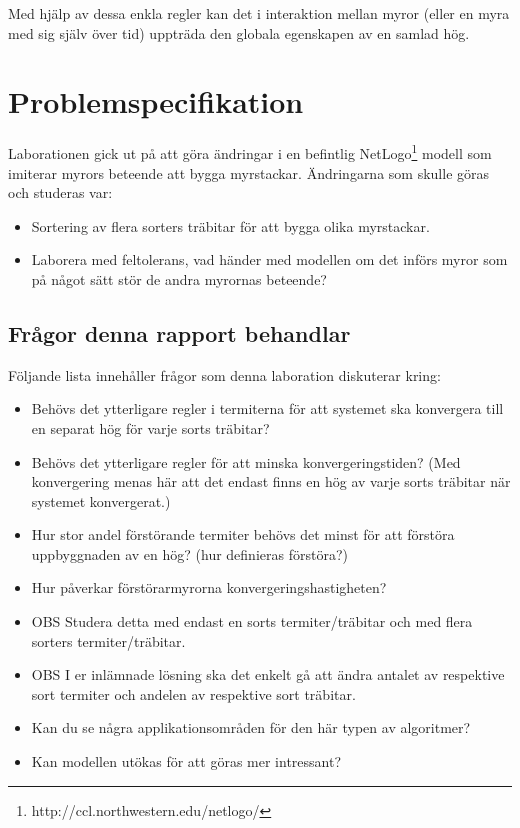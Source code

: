 \documentclass[titlepage, a4paper, 12pt]{article}
\begin{document}
Med hjälp av dessa enkla regler kan det i interaktion mellan myror
(eller en myra med sig själv över tid) uppträda den globala egenskapen
av en samlad hög.

\section{Problemspecifikation}\label{sec:problemspecifikation}
Laborationen gick ut på att göra ändringar i en befintlig
NetLogo\footnote{http://ccl.northwestern.edu/netlogo/} modell som
imiterar myrors beteende att bygga myrstackar. Ändringarna som skulle
göras och studeras var:

\begin{itemize}
\item Sortering av flera sorters träbitar för att bygga olika
  myrstackar.
\item Laborera med feltolerans, vad händer med modellen om det införs
  myror som på något sätt stör de andra myrornas beteende?
\end{itemize}

\subsection{Frågor denna rapport behandlar}
Följande lista innehåller frågor som denna laboration diskuterar
kring:

\begin{itemize}
\item Behövs det ytterligare regler i termiterna för att systemet ska
  konvergera till en separat hög för varje sorts träbitar?
\item Behövs det ytterligare regler för att minska konvergeringstiden?
  (Med konvergering menas här att det endast finns en hög av varje
  sorts träbitar när systemet konvergerat.)
\item Hur stor andel förstörande termiter behövs det minst för att
  förstöra uppbyggnaden av en hög? (hur definieras förstöra?)
\item Hur påverkar förstörarmyrorna konvergeringshastigheten?
\item OBS Studera detta med endast en sorts termiter/träbitar och med
  flera sorters termiter/träbitar.
\item OBS I er inlämnade lösning ska det enkelt gå att ändra antalet
  av respektive sort termiter och andelen av respektive sort träbitar.
\item Kan du se några applikationsområden för den här typen av algoritmer?
\item Kan modellen utökas för att göras mer intressant?
\end{itemize}
\end{document}
